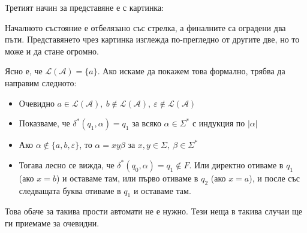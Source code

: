 Третият начин за представяне е с картинка:

\begin{center}
\end{center}

Началното състояние е отбелязано със стрелка, а финалните са оградени два пъти.
Представянето чрез картинка изглежда по-прегледно от другите две, но то може и да стане огромно.

Ясно е, че $\mathcal{L}(\mathcal{A}) = \{ a \}$.
Ако искаме да покажем това формално, трябва да направим следното:
\begin{itemize}
    \item Очевидно $a \in \mathcal{L}(\mathcal{A}), \: b \notin \mathcal{L}(\mathcal{A}), \: \varepsilon \notin \mathcal{L}(\mathcal{A})$
    \item Показваме, че $\delta^*(q_1, \alpha) = q_1$ за всяко $\alpha \in \Sigma^*$ с индукция по $|\alpha|$
    \item Ако $\alpha \notin \{ a, b, \varepsilon \}$, то $\alpha = x y \beta$ за $x, y \in \Sigma, \: \beta \in \Sigma^*$
    \item Тогава лесно се вижда, че $\delta^*(q_0, \alpha) = q_1 \notin F$.
          Или директно отиваме в $q_1$ (ако $x = b$) и оставаме там, или първо отиваме в $q_2$ (ако $x = a$), и после със следващата буква отиваме в $q_1$ и оставаме там.
\end{itemize}

Това обаче за такива прости автомати не е нужно.
Тези неща в такива случаи ще ги приемаме за очевидни.